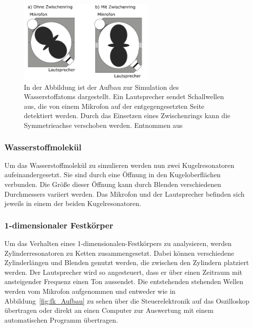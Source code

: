             \begin{figure}[h]
              \centering
              \includegraphics[width = 0.6\textwidth]{pictures/aufbau.png}
              \caption{In der Abbildung ist der Aufbau zur Simulation des Wasserstoffatoms dargestellt. Ein Lautsprecher sendet Schallwellen aus, die von einem Mikrofon auf der entgegengesetzten Seite detektiert werden. Durch das Einsetzen eines Zwischenrings kann die Symmetrieachse verschoben werden. Entnommen aus~\cite{tu_dortmund_versuchsanleitung_2021-4}}
              \label{fig:atom_Aufbau}
            \end{figure}

            \FloatBarrier
        \newpage
        \subsubsection*{Wasserstoffmolekül}
            Um das Wasserstoffmolekül zu simulieren werden nun zwei Kugelresonatoren aufeinandergesetzt. Sie sind durch eine Öffnung in den Kugeloberflächen verbunden. Die Größe dieser Öffnung kann durch 
            Blenden verschiedenen Durchmessers variiert werden. Das Mikrofon und der Lautsprecher befinden sich jeweils in einem der beiden Kugelresonatoren.

        \subsubsection*{1-dimensionaler Festkörper}
            Um das Verhalten eines 1-dimensionalen-Festkörpers zu analysieren, werden Zylinderresonatoren zu Ketten zusammengesetzt. Dabei können verschiedene Zylinderlängen und Blenden genutzt werden, die 
            zwischen den Zylindern platziert werden. Der Lautsprecher wird so angesteuert, dass er über einen Zeitraum mit ansteigender Frequenz einen Ton aussendet. Die entstehenden stehenden Wellen werden 
            vom Mikrofon aufgenommen und entweder wie in Abbildung~\ref{fig:fk_Aufbau} zu sehen über die Steuerelektronik auf das Oszilloskop übertragen oder direkt an einen Computer zur Auswertung mit 
            einem automatischen Programm übertragen. 
            \FloatBarrier

